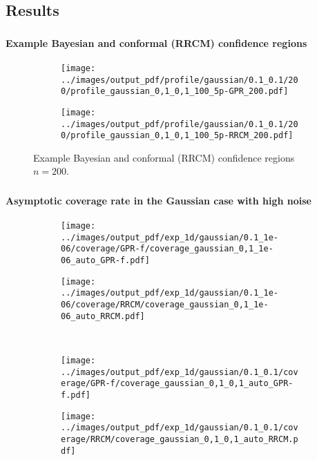 \documentclass[t]{beamer}  %
\begin{document}
\subsection{Results} %
\label{sub:results}

\begin{frame}[c]\frametitle{\insertsection}
  \framesubtitle{Example Bayesian and conformal (RRCM) confidence regions}
  \begin{figure}%
    \centering
    \begin{subfigure}[b]{0.45\linewidth}
      \texttt{[image: ../images/output\_pdf/profile/gaussian/0.1\_0.1/200/profile\_gaussian\_0,1\_0,1\_100\_5p-GPR\_200.pdf]}
    \end{subfigure}%
    \begin{subfigure}[b]{0.45\linewidth}
      \texttt{[image: ../images/output\_pdf/profile/gaussian/0.1\_0.1/200/profile\_gaussian\_0,1\_0,1\_100\_5p-RRCM\_200.pdf]}
    \end{subfigure}
    \caption{Example Bayesian and conformal (RRCM) confidence regions $n=200$.}
    \label{fig:gauss_1d_prof_gpr}
  \end{figure}
\end{frame}

\begin{frame}[t]\frametitle{\insertsection}
  \framesubtitle{Asymptotic coverage rate in the Gaussian case with high noise}
  \begin{figure}
    \centering
    \begin{subfigure}[b]{0.45\linewidth}
      \texttt{[image: ../images/output\_pdf/exp\_1d/gaussian/0.1\_1e-06/coverage/GPR-f/coverage\_gaussian\_0,1\_1e-06\_auto\_GPR-f.pdf]}
    \end{subfigure}%
    \begin{subfigure}[b]{0.45\linewidth}
      \texttt{[image: ../images/output\_pdf/exp\_1d/gaussian/0.1\_1e-06/coverage/RRCM/coverage\_gaussian\_0,1\_1e-06\_auto\_RRCM.pdf]}
    \end{subfigure}\\
    \begin{subfigure}[b]{0.45\linewidth}
      \texttt{[image: ../images/output\_pdf/exp\_1d/gaussian/0.1\_0.1/coverage/GPR-f/coverage\_gaussian\_0,1\_0,1\_auto\_GPR-f.pdf]}
    \end{subfigure}%
    \begin{subfigure}[b]{0.45\linewidth}
      \texttt{[image: ../images/output\_pdf/exp\_1d/gaussian/0.1\_0.1/coverage/RRCM/coverage\_gaussian\_0,1\_0,1\_auto\_RRCM.pdf]}
    \end{subfigure}\\
  \end{figure}
\end{frame}
\end{document}
